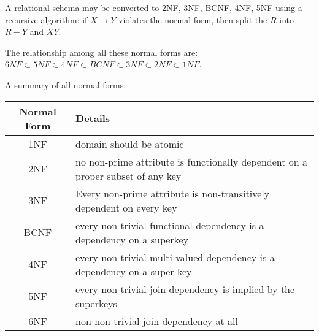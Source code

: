 A relational schema may be converted to 2NF, 3NF, BCNF, 4NF, 5NF using a recursive algorithm: if $X \rightarrow Y$ violates the normal form, then split the $R$ into $R - Y$ and $XY$.


The relationship among all these normal forms are: $6NF \subset 5NF \subset 4NF \subset BCNF \subset 3NF \subset 2NF \subset 1NF $.

A summary of all normal forms:
\begin{center} 
   \begin{tabular}{|c|l|}
  \hline
  Normal Form & Details \\
  \hline
  1NF & domain should be atomic \\
  \hline
  2NF & no non-prime attribute is functionally dependent on a proper subset of any key \\
  \hline
  3NF & Every non-prime attribute is non-transitively dependent on every key \\
  \hline
  BCNF & every non-trivial functional dependency is a dependency on a superkey\\
  \hline
  4NF & every non-trivial multi-valued dependency is a dependency on a super key\\
  \hline
  5NF & every non-trivial join dependency is implied by the superkeys\\
  \hline 
  6NF & non non-trivial join dependency at all\\
  \hline
\end{tabular} 
\end{center}




